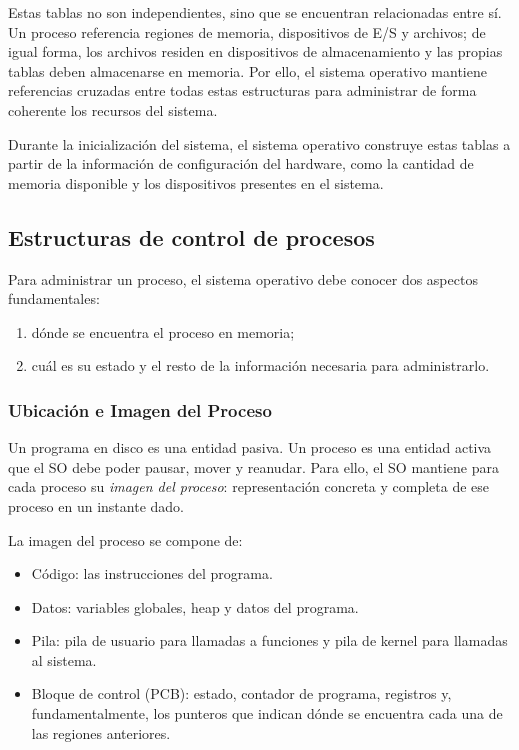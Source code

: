 Estas tablas no son independientes, sino que se encuentran relacionadas entre sí. Un proceso referencia regiones de memoria, dispositivos de E/S y archivos; de igual forma, los archivos residen en dispositivos de almacenamiento y las propias tablas deben almacenarse en memoria. Por ello, el sistema operativo mantiene referencias cruzadas entre todas estas estructuras para administrar de forma coherente los recursos del sistema.

Durante la inicialización del sistema, el sistema operativo construye estas tablas a partir de la información de configuración del hardware, como la cantidad de memoria disponible y los dispositivos presentes en el sistema.

\subsection{Estructuras de control de procesos}

Para administrar un proceso, el sistema operativo debe conocer dos aspectos fundamentales:
\begin{enumerate}
  \item dónde se encuentra el proceso en memoria;
  \item cuál es su estado y el resto de la información necesaria para administrarlo.
\end{enumerate}

\subsubsection{Ubicación e Imagen del Proceso}

Un programa en disco es una entidad pasiva. Un proceso es una entidad activa que el SO debe poder pausar, mover y reanudar. Para ello, el SO mantiene para cada proceso su \emph{imagen del proceso}: representación concreta y completa de ese proceso en un instante dado.

La imagen del proceso se compone de:
\begin{itemize}
  \item Código: las instrucciones del programa.
  \item Datos: variables globales, heap y datos del programa.
  \item Pila: pila de usuario para llamadas a funciones y pila de kernel para llamadas al sistema.
  \item Bloque de control (PCB): estado, contador de programa, registros y, fundamentalmente, los punteros que indican dónde se encuentra cada una de las regiones anteriores.
\end{itemize}

